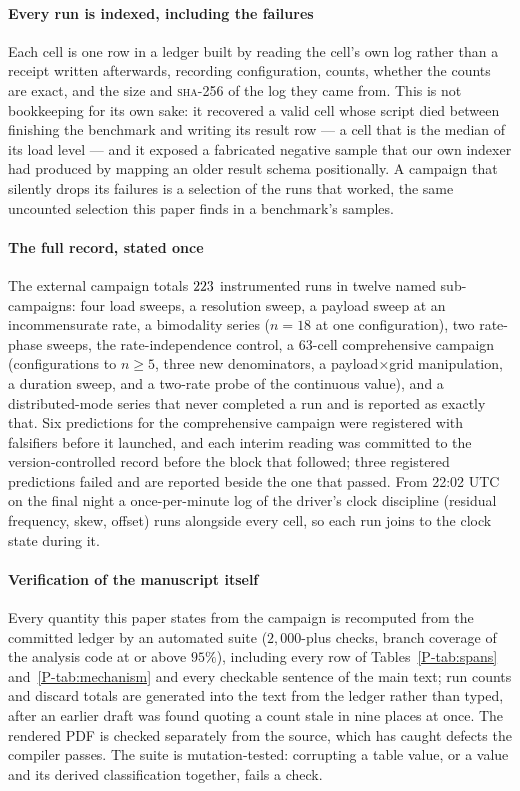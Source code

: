 \documentclass[10pt,journal,onecolumn]{IEEEtran}
\begin{document}
\paragraph{Every run is indexed, including the failures} Each cell is one row in a ledger built by
reading the cell's own log rather than a receipt written afterwards, recording configuration,
counts, whether the counts are exact, and the size and \textsc{sha-256} of the log they came from.
This is not bookkeeping for its own sake: it recovered a valid cell whose script died between
finishing the benchmark and writing its result row --- a cell that is the median of its load level
--- and it exposed a fabricated negative sample that our own indexer had produced by mapping an
older result schema positionally. A campaign that silently drops its failures is a selection of the
runs that worked, the same uncounted selection this paper finds in a benchmark's samples.

\paragraph{The full record, stated once} The external campaign totals $223$ instrumented
runs in twelve named sub-campaigns: four load sweeps, a resolution sweep, a payload sweep at an
incommensurate rate, a bimodality series ($n{=}18$ at one configuration), two rate-phase sweeps,
the rate-independence control, a $63$-cell comprehensive campaign (configurations to $n \ge 5$, three new
denominators, a payload$\times$grid manipulation, a duration sweep, and a two-rate probe of the
continuous value), and a distributed-mode series that never completed a run and
is reported as exactly that. Six predictions for the comprehensive campaign were registered with
falsifiers before it launched, and each interim reading was committed to the version-controlled
record before the block that followed; three registered predictions failed and are reported
beside the one that passed. From 22:02 UTC on the final night a once-per-minute log of the
driver's clock discipline (residual frequency, skew, offset) runs alongside every cell, so each
run joins to the clock state during it.

\paragraph{Verification of the manuscript itself} Every quantity this paper states from the
campaign is recomputed from the committed ledger by an automated suite ($2{,}000$-plus checks,
branch coverage of the analysis code at or above $95\%$), including every row of
Tables~\ref{P-tab:spans} and~\ref{P-tab:mechanism} and every checkable sentence of
the main text; run counts and discard totals are generated into the text from the
ledger rather than typed, after an earlier draft was found quoting a count stale in nine places
at once. The rendered PDF is checked separately from the source, which has caught defects the
compiler passes. The suite is mutation-tested: corrupting a table value, or a value and its
derived classification together, fails a check.
\end{document}
